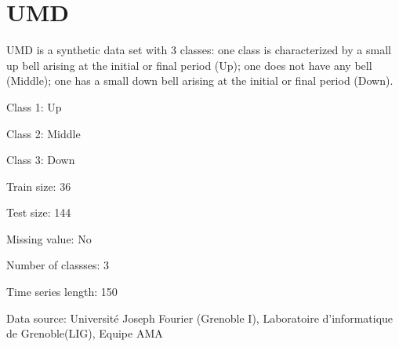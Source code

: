\chapter{UMD}
\hypertarget{md_external_2data_2UCRArchive__2018_2UMD_2README}{}\label{md_external_2data_2UCRArchive__2018_2UMD_2README}
\label{md_external_2data_2UCRArchive__2018_2UMD_2README_autotoc_md224}%
%
 UMD is a synthetic data set with 3 classes\+: one class is characterized by a small up bell arising at the initial or final period (Up); one does not have any bell (Middle); one has a small down bell arising at the initial or final period (Down).


\begin{DoxyItemize}
\item Class 1\+: Up
\item Class 2\+: Middle
\item Class 3\+: Down
\end{DoxyItemize}

Train size\+: 36

Test size\+: 144

Missing value\+: No

Number of classses\+: 3

Time series length\+: 150

Data source\+: Université Joseph Fourier (Grenoble I), Laboratoire d’informatique de Grenoble(\+LIG), Equipe AMA 